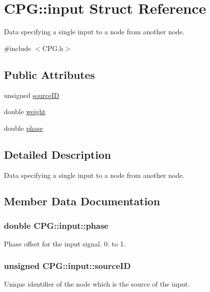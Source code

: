 \hypertarget{structCPG_1_1input}{}\section{C\+PG\+:\+:input Struct Reference}
\label{structCPG_1_1input}


Data specifying a single input to a node from another node.  




{\ttfamily \#include $<$C\+P\+G.\+h$>$}

\subsection*{Public Attributes}
\begin{DoxyCompactItemize}
\item 
unsigned \hyperlink{structCPG_1_1input_a17d97be342dfd27e8b027b30f29010e8}{source\+ID}
\item 
double \hyperlink{structCPG_1_1input_a866947e5b7bc9ab1005a2ca72713450c}{weight}
\item 
double \hyperlink{structCPG_1_1input_af1d90c6c6da3fa5dbf73206beb371c32}{phase}
\end{DoxyCompactItemize}


\subsection{Detailed Description}
Data specifying a single input to a node from another node. 

\subsection{Member Data Documentation}
\subsubsection[{\texorpdfstring{phase}{phase}}]{\setlength{\rightskip}{0pt plus 5cm}double C\+P\+G\+::input\+::phase}\hypertarget{structCPG_1_1input_af1d90c6c6da3fa5dbf73206beb371c32}{}\label{structCPG_1_1input_af1d90c6c6da3fa5dbf73206beb371c32}
Phase offset for the input signal. 0. to 1. 
\subsubsection[{\texorpdfstring{source\+ID}{sourceID}}]{\setlength{\rightskip}{0pt plus 5cm}unsigned C\+P\+G\+::input\+::source\+ID}\hypertarget{structCPG_1_1input_a17d97be342dfd27e8b027b30f29010e8}{}\label{structCPG_1_1input_a17d97be342dfd27e8b027b30f29010e8}
Unique identifier of the node which is the source of the input. 
